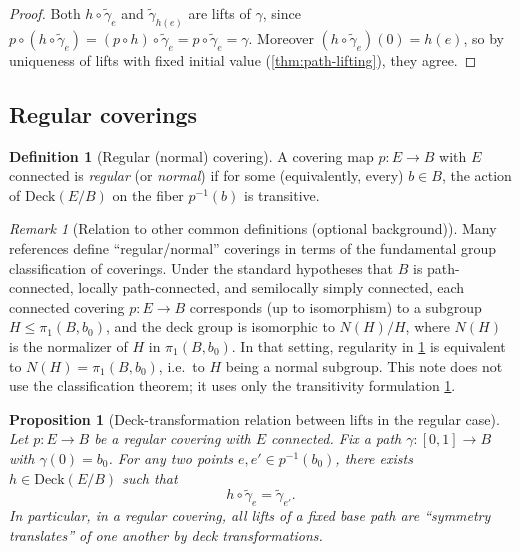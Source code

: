 \documentclass[11pt,a4paper]{article}
\newtheorem{proposition}[theorem]{Proposition}
\theoremstyle{definition}
\newtheorem{definition}[theorem]{Definition}
\theoremstyle{remark}
\newtheorem{remark}[theorem]{Remark}
\begin{document}
\begin{proof}
Both \(h\circ \tilde\gamma_e\) and \(\tilde\gamma_{h(e)}\) are lifts of \(\gamma\), since
\(
p\circ (h\circ \tilde\gamma_e)=(p\circ h)\circ \tilde\gamma_e = p\circ \tilde\gamma_e = \gamma.
\)
Moreover \((h\circ \tilde\gamma_e)(0)=h(e)\), so by uniqueness of lifts with fixed initial value (\cref{thm:path-lifting}), they agree.
\end{proof}

\subsection{Regular coverings}
\label{sec:regular}

\begin{definition}[Regular (normal) covering]
\label{def:regular}
A covering map \(p:E\to B\) with \(E\) connected is \emph{regular} (or \emph{normal}) if for some (equivalently, every) \(b\in B\), the action of \(\mathrm{Deck}(E/B)\) on the fiber \(p^{-1}(b)\) is transitive.
\end{definition}

\begin{remark}[Relation to other common definitions (optional background)]
\label{rem:regular-equivalences}
Many references define ``regular/normal'' coverings in terms of the fundamental group classification of coverings. Under the standard hypotheses that \(B\) is path-connected, locally path-connected, and semilocally simply connected, each connected covering \(p:E\to B\) corresponds (up to isomorphism) to a subgroup \(H\le \pi_1(B,b_0)\), and the deck group is isomorphic to \(N(H)/H\), where \(N(H)\) is the normalizer of \(H\) in \(\pi_1(B,b_0)\). In that setting, regularity in \cref{def:regular} is equivalent to \(N(H)=\pi_1(B,b_0)\), i.e.\ to \(H\) being a normal subgroup. This note does not use the classification theorem; it uses only the transitivity formulation \cref{def:regular}.
\end{remark}

\begin{proposition}[Deck-transformation relation between lifts in the regular case]
\label{prop:regular-deck-relation}
Let \(p:E\to B\) be a regular covering with \(E\) connected. Fix a path \(\gamma:[0,1]\to B\) with \(\gamma(0)=b_0\). For any two points \(e,e'\in p^{-1}(b_0)\), there exists \(h\in \mathrm{Deck}(E/B)\) such that
\[
h\circ \tilde\gamma_e = \tilde\gamma_{e'}.
\]
In particular, in a regular covering, all lifts of a fixed base path are ``symmetry translates'' of one another by deck transformations.
\end{proposition}
\end{document}
